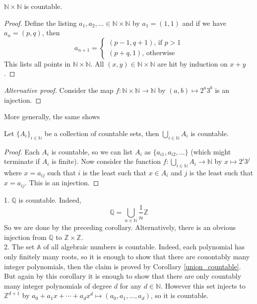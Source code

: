 \begin{theorem}
    $\mathbb N\times\mathbb N$ is countable.
\end{theorem}
\begin{proof}
    Define the listing $a_1,a_2,\ldots\in\mathbb N\times\mathbb N$ by $a_1=(1,1)$ and if we have $a_n=(p,q)$, then
    $$a_{n+1}=\begin{cases}
        (p-1,q+1)\text{, if $p>1$}\\
        (p+q,1)\text{, otherwise}
    \end{cases}$$
    This lists all points in $\mathbb N\times\mathbb N$.
    All $(x,y)\in\mathbb N\times\mathbb N$ are hit by induction on $x+y$.
\end{proof}
\begin{proof}[Alternative proof]
    Consider the map $f:\mathbb N\times\mathbb N\to\mathbb N$ by $(a,b)\mapsto 2^a3^b$ is an injection.
\end{proof}
More generally, the same shows
\begin{corollary}\label{union_countable}
    Let $\{A_i\}_{i\in\mathbb N}$ be a collection of countable sets, then $\bigcup_{i\in \mathbb N}A_i$ is countable.
\end{corollary}
\begin{proof}
    Each $A_i$ is countable, so we can list $A_i$ as $\{a_{i1},a_{i2},\ldots\}$ (which might terminate if $A_i$ is finite).
    Now consider the function $f:\bigcup_{i\in \mathbb N}A_i\to\mathbb N$ by $x\mapsto 2^i3^j$ where $x=a_{ij}$ such that $i$ is the least such that $x\in A_i$ and $j$ is the least such that $x=a_{ij}$.
    This is an injection.
\end{proof}
\begin{example}
    1. $\mathbb Q$ is countable.
    Indeed,
    $$\mathbb Q=\bigcup_{n\in\mathbb N}\frac{1}{n}\mathbb Z$$
    So we are done by the preceding corollary.
    Alternatively, there is an obvious injection from $\mathbb Q$ to $\mathbb Z\times\mathbb Z$.\\
    2. The set $\mathbb A$ of all algebraic numbers is countable.
    Indeed, each polynomial has only finitely many roots, so it is enough to show that there are couontably many integer polynomials, then the claim is proved by Corollary \ref{union_countable}.
    But again by this corollary it is enough to show that there are only countably many integer polynomials of degree $d$ for any $d\in\mathbb N$.
    However this set injects to $\mathbb Z^{d+1}$ by $a_0+a_1x+\cdots+a_dx^d\mapsto (a_0,a_1,\ldots,a_d)$, so it is countable.
\end{example}
